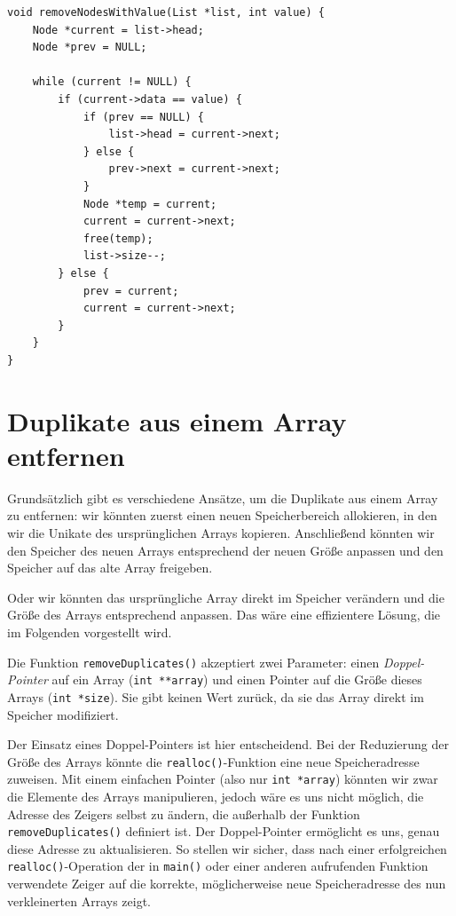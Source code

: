 \begin{verbatim}
void removeNodesWithValue(List *list, int value) {
    Node *current = list->head;
    Node *prev = NULL;

    while (current != NULL) {
        if (current->data == value) {
            if (prev == NULL) {
                list->head = current->next;
            } else {
                prev->next = current->next;
            }
            Node *temp = current;
            current = current->next;
            free(temp);
            list->size--;
        } else {
            prev = current;
            current = current->next;
        }
    }
}
\end{verbatim}





\chapter{Duplikate aus einem Array entfernen}

Grundsätzlich gibt es verschiedene Ansätze, um die Duplikate aus einem Array zu
entfernen: wir könnten zuerst einen neuen Speicherbereich allokieren, in den wir
die Unikate des ursprünglichen Arrays kopieren. Anschließend könnten wir den
Speicher des neuen Arrays entsprechend der neuen Größe anpassen und den Speicher
auf das alte Array freigeben.

Oder wir könnten das ursprüngliche Array direkt im Speicher verändern und die
Größe des Arrays entsprechend anpassen. Das wäre eine effizientere Lösung, die
im Folgenden vorgestellt wird.

Die Funktion \texttt{removeDuplicates()} akzeptiert zwei Parameter: einen
\textit{Doppel-Pointer} auf ein Array (\texttt{int **array}) und einen
Pointer auf die Größe dieses Arrays (\texttt{int *size}). Sie gibt keinen
Wert zurück, da sie das Array direkt im Speicher modifiziert.

Der Einsatz eines Doppel-Pointers ist hier entscheidend. Bei der Reduzierung der
Größe des Arrays könnte die \texttt{realloc()}-Funktion eine neue
Speicheradresse zuweisen. Mit einem einfachen Pointer (also nur
\texttt{int *array}) könnten wir zwar die Elemente des Arrays
manipulieren, jedoch wäre es uns nicht möglich, die Adresse des Zeigers selbst
zu ändern, die außerhalb der Funktion \texttt{removeDuplicates()}
definiert ist. Der Doppel-Pointer ermöglicht es uns, genau diese Adresse zu
aktualisieren. So stellen wir sicher, dass nach einer erfolgreichen
\texttt{realloc()}-Operation der in \texttt{main()} oder einer
anderen aufrufenden Funktion verwendete Zeiger auf die korrekte, möglicherweise
neue Speicheradresse des nun verkleinerten Arrays zeigt.

